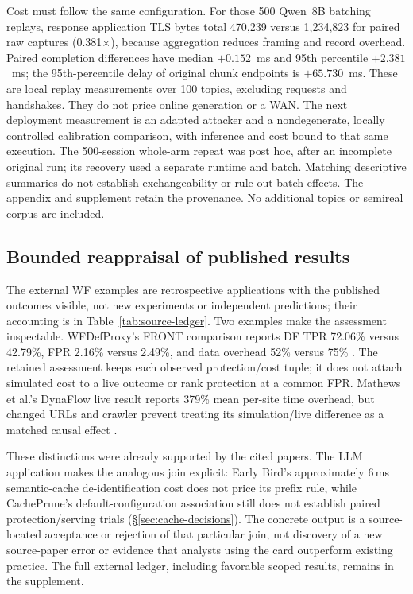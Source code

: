 Cost must follow the same configuration. For those 500 Qwen~8B batching replays, response application TLS bytes total 470,239 versus 1,234,823 for paired raw captures (0.381$\times$), because aggregation reduces framing and record overhead. Paired completion differences have median $+0.152$~ms and 95th percentile $+2.381$~ms; the 95th-percentile delay of original chunk endpoints is $+65.730$~ms. These are local replay measurements over 100 topics, excluding requests and handshakes. They do not price online generation or a WAN. The next deployment measurement is an adapted attacker and a nondegenerate, locally controlled calibration comparison, with inference and cost bound to that same execution. The 500-session whole-arm repeat was post hoc, after an incomplete original run; its recovery used a separate runtime and batch. Matching descriptive summaries do not establish exchangeability or rule out batch effects. The appendix and supplement retain the provenance. No additional topics or semireal corpus are included.

\subsection{Bounded reappraisal of published results}
The external WF examples are retrospective applications with the published outcomes visible, not new experiments or independent predictions; their accounting is in Table~\ref{tab:source-ledger}. Two examples make the assessment inspectable. WFDefProxy's FRONT comparison reports DF TPR 72.06\% versus 42.79\%, FPR 2.16\% versus 2.49\%, and data overhead 52\% versus 75\% \cite[6.2, Table~10]{gong2021wfdefproxy}. The retained assessment keeps each observed protection/cost tuple; it does not attach simulated cost to a live outcome or rank protection at a common FPR. Mathews et al.'s DynaFlow live result reports 379\% mean per-site time overhead, but changed URLs and crawler prevent treating its simulation/live difference as a matched causal effect \cite[IV-F, Table~II; Appendix~B]{mathews2023critical}.

These distinctions were already supported by the cited papers. The LLM application makes the analogous join explicit: Early Bird's approximately 6\,ms semantic-cache de-identification cost does not price its prefix rule, while CachePrune's default-configuration association still does not establish paired protection/serving trials (\S\ref{sec:cache-decisions}). The concrete output is a source-located acceptance or rejection of that particular join, not discovery of a new source-paper error or evidence that analysts using the card outperform existing practice. The full external ledger, including favorable scoped results, remains in the supplement.

